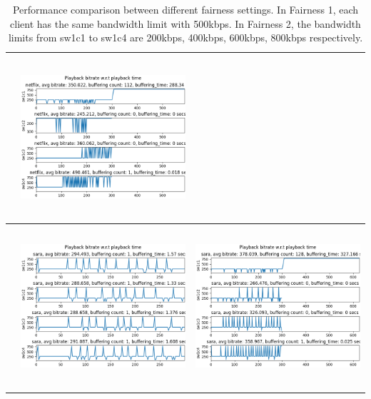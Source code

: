 \documentclass[12pt]{article}
\begin{document}
\begin{table}[ht]
\begin{tabular}{ | m{1em} | c | c |}
\begin{minipage}{.45\textwidth}
    \end{minipage}
    & 
    \begin{minipage}{.45\textwidth}
      \includegraphics[width=\linewidth, height=60mm]{images/results/fairness_2_netflix.png}
    \end{minipage}
    \\ \hline
    \parbox[t]{2mm}{}
    &
    \begin{minipage}{.45\textwidth}
      \includegraphics[width=\linewidth, height=60mm]{images/results/fairness_sara.png}
    \end{minipage}
    &
    \begin{minipage}{.45\textwidth}
      \includegraphics[width=\linewidth, height=60mm]{images/results/fairness_2_sara.png}
    \end{minipage}
    \\ \hline
  \end{tabular}
  \caption{Performance comparison between different fairness settings. In Fairness 1, each client has the same bandwidth limit with 500kbps. In Fairness 2, the bandwidth limits from sw1c1 to sw1c4 are 200kbps, 400kbps, 600kbps, 800kbps respectively.}\label{tbl:fairness}
\end{table}
\end{document}

